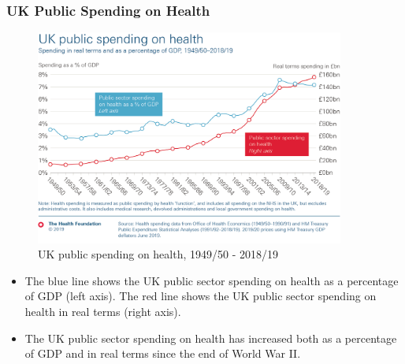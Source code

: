        \subsubsection{UK Public Spending on Health}         
            \begin{figure}[H]
                \centering
                \includegraphics[width=4in]{images/ch3/6.png}
                \caption{UK public spending on health, 1949/50 - 2018/19}
            \end{figure} 
            \begin{itemize}           
                \item The blue line shows the UK public sector spending on health as a percentage of GDP (left axis). The red line shows the UK public sector spending on health in real terms (right axis).
                \item The UK public sector spending on health has increased both as a percentage of GDP and in real terms since the end of World War II.
            \end{itemize}

